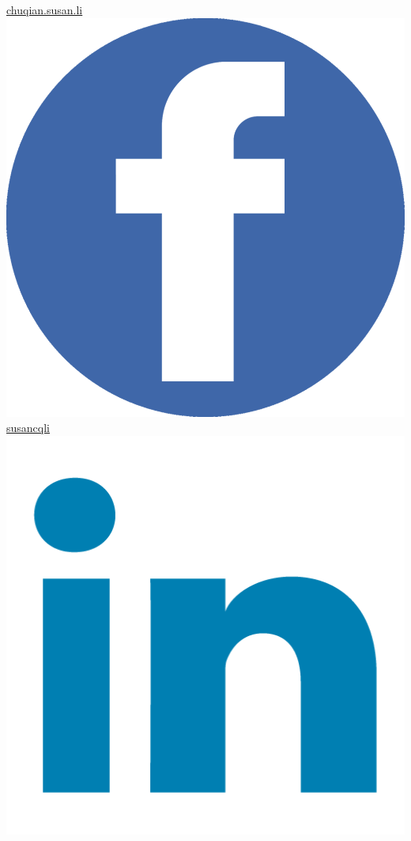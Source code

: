 \documentclass[]{friggeri-cv}
\begin{document}
\begin{aside}
  \href{https://www.facebook.com/chuqian.susan.li}{chuqian.susan.li \includegraphics[scale=0.01]{fbroundicon.png}}
  \href{https://www.linkedin.com/in/susancqli}{susancqli \includegraphics[scale=0.04]{linkedin-png-hd.png}}

\end{aside}
\end{document}

